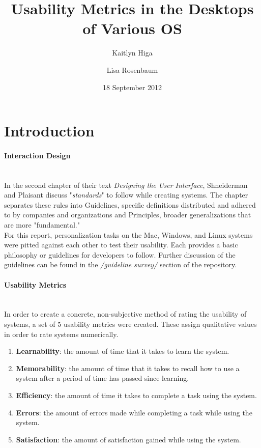 \documentclass[12pt, onesided, letterpaper]{report}
\begin{document}
\title{Usability Metrics in the Desktops of Various OS}
\date{18 September 2012}
\author{Kaitlyn Higa \and Lisa Rosenbaum}
\maketitle


\section*{Introduction}
\paragraph*{Interaction Design}~\\

In the second chapter of their text \emph{Designing the User Interface}, Shneiderman and Plaisant discuss "\emph{standards}" to follow while creating systems.  The chapter separates these rules into Guidelines, specific definitions distributed and adhered to by companies and organizations and Principles, broader generalizations that are more "fundamental."  \\

For this report, personalization tasks on the Mac, Windows, and Linux systems were pitted against each other to test their usability.  Each provides a basic philosophy or guidelines for developers to follow.  Further discussion of the guidelines can be found in the \textit{/guideline survey/} section of the repository.  
\paragraph*{Usability Metrics} ~\\

In order to create a concrete, non-subjective method of rating the usability of systems, a set of 5 usability metrics were created.  These assign qualitative values in order to rate systems numerically. 
\begin{enumerate}
\item \textbf{Learnability}: the amount of time that it takes to learn the system.  
\item \textbf{Memorability}: the amount of time that it takes to recall how to use a system after a period of time has passed since learning.  
\item \textbf{Efficiency}: the amount of time it takes to complete a task using the system.
\item \textbf{Errors}: the amount of errors made while completing a task while using the system.
\item \textbf{Satisfaction}: the amount of satisfaction gained while using the system. 
\end{enumerate}
\end{document}
